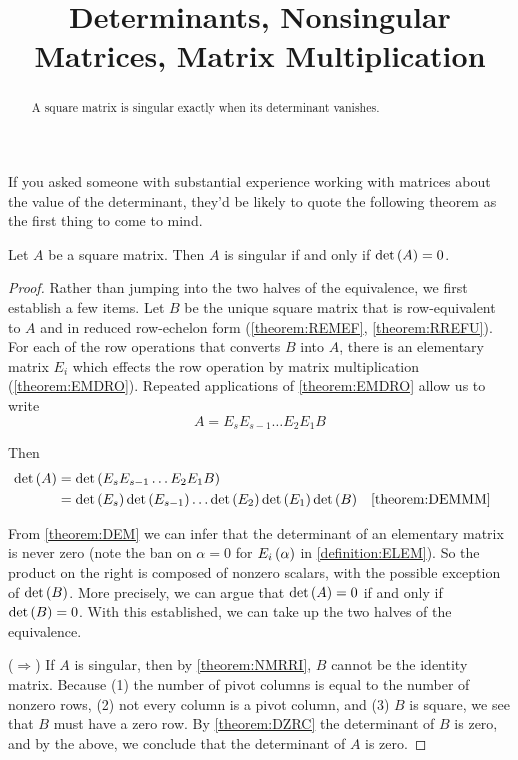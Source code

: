 \documentclass{ximera}
\title{Determinants, Nonsingular Matrices, Matrix Multiplication}
\begin{document}
\begin{abstract}
  A square matrix is singular exactly when its determinant vanishes.
\end{abstract}
\maketitle

If you asked someone with substantial experience working with matrices
about the value of the determinant, they'd be likely to quote the
following theorem as the first thing to come to mind.

\begin{theorem}
  \label{theorem:SMZD}

  Let $A$ be a square matrix.  Then $A$ is singular if and only if $\det\left(A\right)=0$.

  \begin{proof}
    Rather than jumping into the two halves of the equivalence, we
    first establish a few items.  Let $B$ be the unique square matrix
    that is row-equivalent to $A$ and in reduced row-echelon form
    (\ref{theorem:REMEF}, \ref{theorem:RREFU}).  For each of the row
    operations that converts $B$ into $A$, there is an elementary
    matrix $E_i$ which effects the row operation by matrix
    multiplication (\ref{theorem:EMDRO}).  Repeated applications of
    \ref{theorem:EMDRO} allow us to write
    \[
      A=E_sE_{s-1}\dots E_2E_1B
    \]

    Then
    \begin{align*}
      \det\left(A\right)
      &=
        \det\left(E_sE_{s-1}\dots E_2E_1B\right)\\
      &=\det\left(E_s\right)\det\left(E_{s-1}\right)\dots\det\left(E_2\right)\det\left(E_1\right)\det\left(B\right)
      &&\ref{theorem:DEMMM}
    \end{align*}

    From \ref{theorem:DEM} we can infer that the determinant of an
    elementary matrix is never zero (note the ban on $\alpha=0$ for
    $E_{i}\left(\alpha\right)$ in \ref{definition:ELEM}).  So the product
    on the right is composed of nonzero scalars, with the possible
    exception of $\det\left(B\right)$.  More precisely, we can argue that
    $\det\left(A\right)=0$ if and only if $\det\left(B\right)=0$.  With this
    established, we can take up the two halves of the equivalence.

    ($\Rightarrow$) If $A$ is singular, then by \ref{theorem:NMRRI},
    $B$ cannot be the identity matrix.  Because (1) the number of
    pivot columns is equal to the number of nonzero rows, (2) not
    every column is a pivot column, and (3) $B$ is square, we see that
    $B$ must have a zero row.  By \ref{theorem:DZRC} the determinant
    of $B$ is zero, and by the above, we conclude that the determinant
    of $A$ is zero.


\end{proof}
\end{theorem}
\end{document}
